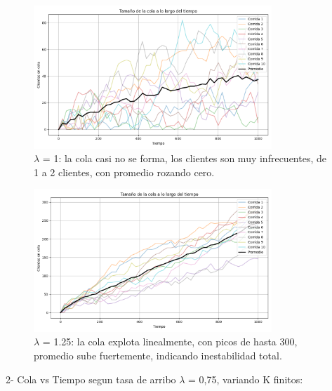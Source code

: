 \documentclass{article}
\begin{document}
    \begin{figure}[h!]
        \centering
        \includegraphics[width=0.8\textwidth]{Imagenes/MM1/cola_vs_tiempo_1.0_infinita.png}
        \caption{\( \lambda \) = 1: la cola casi no se forma, los clientes son muy infrecuentes, de 1 a 2 clientes, con promedio rozando cero.}
        \label{fig:ejemplo}
    \end{figure}
    
    \begin{figure}[h!]
        \centering
        \includegraphics[width=0.8\textwidth]{Imagenes/MM1/cola_vs_tiempo_1.25_infinita.png}
        \caption{\( \lambda \) = 1.25:  la cola explota linealmente, con picos de hasta 300, promedio sube fuertemente, indicando inestabilidad total.}
        \label{fig:ejemplo}
    \end{figure}
\FloatBarrier

2- Cola vs Tiempo segun tasa de arribo  \( \lambda \) = 0,75, variando K finitos:
\end{document}
